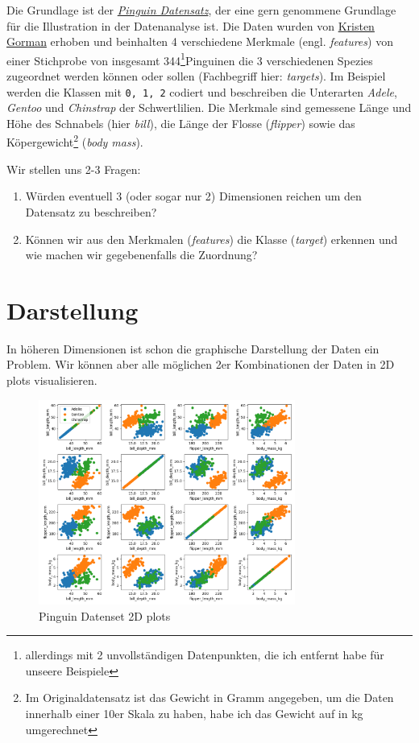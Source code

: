 \documentclass[]{book}
\providecommand{\tightlist}{%
  \setlength{\itemsep}{0pt}\setlength{\parskip}{0pt}}
\theoremstyle{definition}
\theoremstyle{definition}
\theoremstyle{definition}
\theoremstyle{definition}
\theoremstyle{remark}
\begin{document}
Die Grundlage ist der \href{https://allisonhorst.github.io/palmerpenguins/}{\emph{Pinguin Datensatz}}, der eine gern genommene Grundlage für die Illustration in der Datenanalyse ist. Die Daten wurden von \href{https://www.uaf.edu/cfos/people/faculty/detail/kristen-gorman.php}{Kristen Gorman} erhoben und beinhalten 4 verschiedene Merkmale (engl. \emph{features}) von einer Stichprobe von insgesamt 344\footnote{allerdings mit 2 unvollständigen Datenpunkten, die ich entfernt habe für unseere Beispiele}Pinguinen die 3 verschiedenen Spezies zugeordnet werden können oder sollen (Fachbegriff hier: \emph{targets}). Im Beispiel werden die Klassen mit \texttt{0,\ 1,\ 2} codiert und beschreiben die Unterarten \emph{Adele}, \emph{Gentoo} und \emph{Chinstrap} der Schwertlilien. Die Merkmale sind gemessene Länge und Höhe des Schnabels (hier \emph{bill}), die Länge der Flosse (\emph{flipper}) sowie das Köpergewicht\footnote{Im Originaldatensatz ist das Gewicht in Gramm angegeben, um die Daten innerhalb einer 10er Skala zu haben, habe ich das Gewicht auf in kg umgerechnet}
(\emph{body mass}).

Wir stellen uns 2-3 Fragen:

\begin{enumerate}
\def\labelenumi{\arabic{enumi}.}
\tightlist
\item
  Würden eventuell 3 (oder sogar nur 2) Dimensionen reichen um den Datensatz zu beschreiben?
\item
  Können wir aus den Merkmalen (\emph{features}) die Klasse (\emph{target}) erkennen und wie machen wir gegebenenfalls die Zuordnung?
\end{enumerate}

\hypertarget{darstellung}{%
\section{Darstellung}\label{darstellung}}

In höheren Dimensionen ist schon die graphische Darstellung der Daten ein Problem. Wir können aber alle möglichen 2er Kombinationen der Daten in 2D plots visualisieren.

\begin{figure}
\hypertarget{fig:05-penguin-allpairs}{%
\centering
\includegraphics[width=0.75\textwidth,height=\textheight]{bilder/05-all-pairs.png}
\caption{Pinguin Datenset 2D plots}\label{fig:05-penguin-allpairs}
}
\end{figure}
\end{document}
